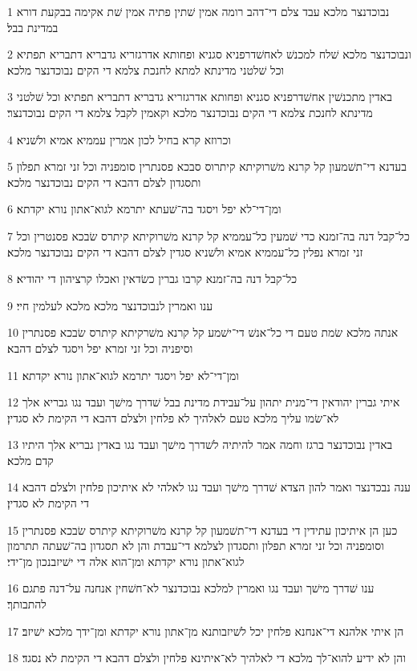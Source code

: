 \par 1 נבוכדנצר מלכא עבד צלם די־דהב רומה אמין שׁתין פתיה אמין שׁת אקימה בבקעת דורא במדינת בבל׃
\par 2 ונבוכדנצר מלכא שׁלח למכנשׁ לאחשׁדרפניא סגניא ופחותא אדרגזריא גדבריא דתבריא תפתיא וכל שׁלטני מדינתא למתא לחנכת צלמא די הקים נבוכדנצר מלכא׃
\par 3 באדין מתכנשׁין אחשׁדרפניא סגניא ופחותא אדרגזריא גדבריא דתבריא תפתיא וכל שׁלטני מדינתא לחנכת צלמא די הקים נבוכדנצר מלכא וקאמין לקבל צלמא די הקים נבוכדנצר׃
\par 4 וכרוזא קרא בחיל לכון אמרין עממיא אמיא ולשׁניא׃
\par 5 בעדנא די־תשׁמעון קל קרנא משׁרוקיתא קיתרוס סבכא פסנתרין סומפניה וכל זני זמרא תפלון ותסגדון לצלם דהבא די הקים נבוכדנצר מלכא׃
\par 6 ומן־די־לא יפל ויסגד בה־שׁעתא יתרמא לגוא־אתון נורא יקדתא׃
\par 7 כל־קבל דנה בה־זמנא כדי שׁמעין כל־עממיא קל קרנא משׁרוקיתא קיתרס שׂבכא פסנטרין וכל זני זמרא נפלין כל־עממיא אמיא ולשׁניא סגדין לצלם דהבא די הקים נבוכדנצר מלכא׃
\par 8 כל־קבל דנה בה־זמנא קרבו גברין כשׂדאין ואכלו קרציהון די יהודיא׃
\par 9 ענו ואמרין לנבוכדנצר מלכא מלכא לעלמין חיי׃
\par 10 אנתה מלכא שׂמת טעם די כל־אנשׁ די־ישׁמע קל קרנא משׁרקיתא קיתרס שׂבכא פסנתרין וסיפניה וכל זני זמרא יפל ויסגד לצלם דהבא׃
\par 11 ומן־די־לא יפל ויסגד יתרמא לגוא־אתון נורא יקדתא׃
\par 12 איתי גברין יהודאין די־מנית יתהון על־עבידת מדינת בבל שׁדרך מישׁך ועבד נגו גבריא אלך לא־שׂמו עליך מלכא טעם לאלהיך לא פלחין ולצלם דהבא די הקימת לא סגדין׃
\par 13 באדין נבוכדנצר ברגז וחמה אמר להיתיה לשׁדרך מישׁך ועבד נגו באדין גבריא אלך היתיו קדם מלכא׃
\par 14 ענה נבכדנצר ואמר להון הצדא שׁדרך מישׁך ועבד נגו לאלהי לא איתיכון פלחין ולצלם דהבא די הקימת לא סגדין׃
\par 15 כען הן איתיכון עתידין די בעדנא די־תשׁמעון קל קרנא משׁרוקיתא קיתרס שׂבכא פסנתרין וסומפניה וכל זני זמרא תפלון ותסגדון לצלמא די־עבדת והן לא תסגדון בה־שׁעתה תתרמון לגוא־אתון נורא יקדתא ומן־הוא אלה די ישׁיזבנכון מן־ידי׃
\par 16 ענו שׁדרך מישׁך ועבד נגו ואמרין למלכא נבוכדנצר לא־חשׁחין אנחנה על־דנה פתגם להתבותך׃
\par 17 הן איתי אלהנא די־אנחנא פלחין יכל לשׁיזבותנא מן־אתון נורא יקדתא ומן־ידך מלכא ישׁיזב׃
\par 18 והן לא ידיע להוא־לך מלכא די לאלהיך לא־איתינא פלחין ולצלם דהבא די הקימת לא נסגד׃
